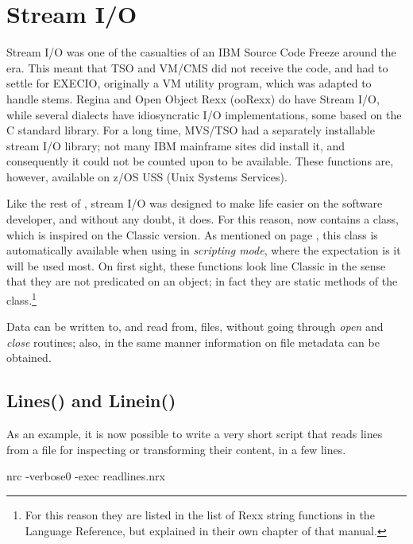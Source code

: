 \chapter{Stream I/O}\label{refstreamio}

 Stream I/O was one of the casualties of an IBM Source Code Freeze around the  era. This meant that TSO and VM/CMS \Rexx{} did not receive the code, and had to settle for EXECIO, originally a VM utility program, which was adapted to handle \Rexx{} stems. Regina and Open Object Rexx (ooRexx) do have Stream I/O, while several dialects have idiosyncratic I/O implementations, some based on the C standard library. For a long time, MVS/TSO had a separately installable stream I/O library; not many IBM mainframe sites did install it, and consequently it could not be counted upon to be available. These functions are, however, available on z/OS USS (Unix Systems Services).

Like the rest of \Rexx{}, stream I/O was designed to make life easier on the software developer, and without any doubt, it does. For this reason, \nr{} now contains a  class, which is inspired on the Classic \Rexx version. As mentioned on page \pageref{refscripting}, this class is automatically available when using \nr{} in \emph{scripting mode}, where the expectation is it will be used most. On first sight, these functions look line Classic \Rexx{} in the sense that they are not predicated on an object; in fact they are static methods of the  class.\footnote{For this reason they are listed in the list of Rexx string functions in the \nr{} Language Reference, but explained in their own chapter of that manual.}

Data can be written to, and read from, files, without going through \emph{open} and \emph{close} routines; also, in the same manner information on file metadata can be obtained.

\section{Lines() and Linein()}
As an example, it is now possible to write a very short script that reads lines from a file for inspecting or transforming their content, in a few lines.



\begin{shaded}
\bash[stdout]
nrc -verbose0 -exec readlines.nrx
\END
\end{shaded}

